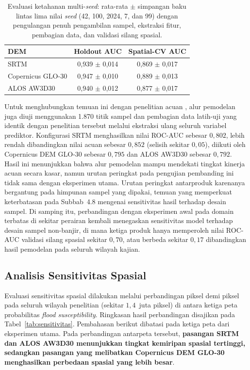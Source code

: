 \documentclass[12pt]{article}
\begin{document}
\begin{table}[ht]
\centering
\caption{Evaluasi ketahanan multi-\textit{seed}: rata-rata $\pm$ simpangan baku lintas lima nilai \textit{seed} (42, 100, 2024, 7, dan 99) dengan pengulangan penuh pengambilan sampel, ekstraksi fitur, pembagian data, dan validasi silang spasial.}
\label{tab:multiseed}
\begin{tabular}{lcc}
\toprule
\textbf{DEM} & \textbf{Holdout AUC} & \textbf{Spatial-CV AUC} \\
\midrule
SRTM               & 0,939 $\pm$ 0,014 & 0,869 $\pm$ 0,017 \\
Copernicus GLO-30  & 0,947 $\pm$ 0,010 & 0,889 $\pm$ 0,013 \\
ALOS AW3D30        & 0,940 $\pm$ 0,012 & 0,877 $\pm$ 0,017 \\
\bottomrule
\end{tabular}
\end{table}

Untuk menghubungkan temuan ini dengan penelitian acuan \cite{hakim2026}, alur
pemodelan juga diuji menggunakan 1.870 titik sampel dan pembagian data
latih-uji yang identik dengan penelitian tersebut melalui ekstraksi ulang
seluruh variabel prediktor. Konfigurasi SRTM menghasilkan nilai ROC-AUC
sebesar $0{,}802$, lebih rendah dibandingkan nilai acuan sebesar $0{,}852$
(selisih sekitar $0{,}05$), diikuti oleh Copernicus DEM GLO-30 sebesar
$0{,}795$ dan ALOS AW3D30 sebesar $0{,}792$. Hasil ini menunjukkan bahwa alur
pemodelan mampu mendekati tingkat kinerja acuan secara kasar, namun urutan
peringkat pada pengujian pembanding ini tidak sama dengan eksperimen utama.
Urutan peringkat antarproduk karenanya bergantung pada himpunan sampel yang
dipakai, temuan yang memperkuat keterbatasan pada Subbab~4.8 mengenai
sensitivitas hasil terhadap desain sampel. Di samping itu, perbandingan
dengan eksperimen awal pada domain terbatas di sekitar perairan kembali
menegaskan sensitivitas model terhadap desain sampel
non-banjir, di mana ketiga produk hanya memperoleh nilai ROC-AUC validasi
silang spasial sekitar $0{,}70$, atau berbeda sekitar $0{,}17$ dibandingkan
hasil pemodelan pada seluruh wilayah kajian.

\subsection{Analisis Sensitivitas Spasial}

Evaluasi sensitivitas spasial dilakukan melalui perbandingan piksel demi
piksel pada seluruh wilayah penelitian (sekitar $1{,}4$~juta piksel) di
antara ketiga peta probabilitas \textit{flood susceptibility}. Ringkasan hasil
perbandingan disajikan pada Tabel~\ref{tab:sensitivitas}. Pembahasan
berikut dibatasi pada ketiga peta dari eksperimen utama. Pada perbandingan
antarpeta tersebut, \textbf{pasangan SRTM
dan ALOS AW3D30 menunjukkan
tingkat kemiripan spasial tertinggi, sedangkan pasangan yang melibatkan
Copernicus DEM GLO-30 menghasilkan perbedaan spasial yang lebih besar}.
\end{document}
